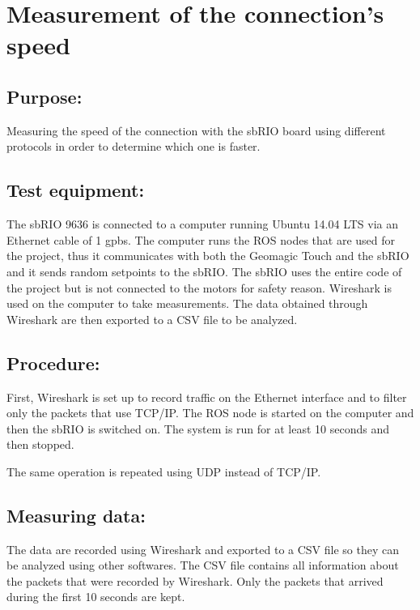 \section*{Measurement of the connection's speed} %

\subsection*{Purpose:}

Measuring the speed of the connection with the sbRIO board using different protocols in order to determine which one is faster. 

\subsection*{Test equipment:}

The sbRIO 9636 is connected to a computer running Ubuntu 14.04 LTS via an Ethernet cable of 1 gpbs. The computer runs the ROS nodes that are used for the project, thus it communicates with both the Geomagic Touch and the sbRIO and it sends random setpoints to the sbRIO. The sbRIO uses the entire code of the project but is not connected to the motors for safety reason. 
Wireshark is used on the computer to take measurements. The data obtained through Wireshark are then exported to a CSV file to be analyzed.

\subsection*{Procedure:}

First, Wireshark is set up to record traffic on the Ethernet interface and to filter only the packets that use TCP/IP. The ROS node is started on the computer and then the sbRIO is switched on. The system is run for at least 10 seconds and then stopped.

The same operation is repeated using UDP instead of TCP/IP.

\subsection*{Measuring data:}

The data are recorded using Wireshark and exported to a CSV file so they can be analyzed using other softwares. The CSV file contains all information about the packets that were recorded by Wireshark. Only the packets that arrived during the first 10 seconds are kept.

